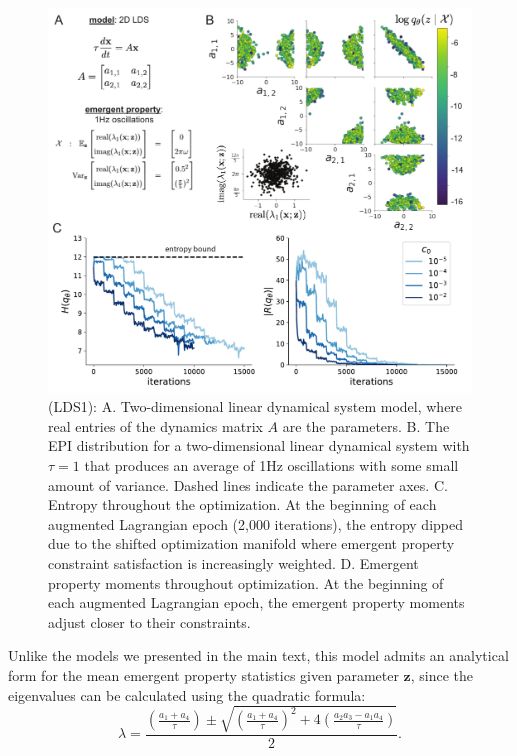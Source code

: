 \documentclass[11pt]{article}
\begin{document}
\begin{figure}
\begin{center}
\includegraphics[scale=0.8]{figures/figLDS1/figLDS1.pdf}
\end{center}
\begin{flushleft}
\caption{\small (LDS1): A. Two-dimensional linear dynamical system model, where real entries of the dynamics matrix $A$ are the parameters.  
B. The EPI distribution for a two-dimensional linear dynamical system with $\tau=1$ that produces an average of 1Hz oscillations with some small amount of variance.  Dashed lines indicate the parameter axes. 
C. Entropy throughout the optimization.  
At the beginning of each augmented Lagrangian epoch (2,000 iterations), the entropy dipped due to the shifted optimization manifold where emergent property constraint satisfaction is increasingly weighted.  
D. Emergent property moments throughout optimization.  
At the beginning of each augmented Lagrangian epoch, the emergent property moments adjust closer to their constraints.}
\end{flushleft}
\label{fig:LDS1}
\end{figure}

Unlike the models we presented in the main text, this model admits an analytical form for the mean emergent property statistics given parameter $\mathbf{z}$, since the eigenvalues can be calculated using the quadratic formula: 
\begin{equation}
\lambda = \frac{(\frac{a_1 + a_4}{\tau}) \pm \sqrt{(\frac{a_1+a_4}{\tau})^2 + 4(\frac{a_2 a_3 - a_1 a_4}{\tau})}}{2}.
\end{equation}
\end{document}
